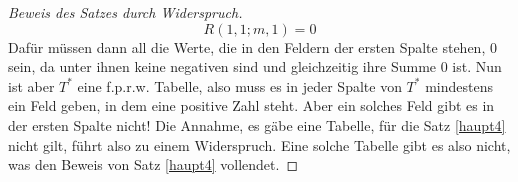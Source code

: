 \begin{proof}[Beweis des Satzes durch Widerspruch]
    \[
    R(1, 1; m, 1)= 0
    \]
    Dafür müssen dann all die Werte, die in den Feldern der ersten Spalte stehen, 0 sein, da unter ihnen keine 
    negativen sind und gleichzeitig ihre Summe 0 ist. Nun ist aber $T^*$ eine f.p.r.w. Tabelle, also muss es in jeder 
    Spalte von $T^*$ mindestens ein Feld geben, in dem eine positive Zahl steht. Aber ein solches Feld gibt es in 
    der ersten Spalte nicht! Die Annahme, es gäbe eine Tabelle, für die Satz \ref{haupt4} nicht gilt, führt also zu 
    einem Widerspruch. Eine solche Tabelle gibt es also nicht, was den Beweis von Satz \ref{haupt4} vollendet.
    \renewcommand{\qedsymbol}{$\blacksquare$}
\end{proof}
